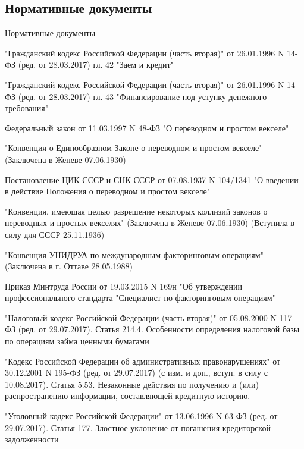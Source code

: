 \documentclass[_Banking_p3.tex]{subfiles}
\begin{document}

\subsection{Нормативные документы}
\begin{frame}[allowframebreaks]{Нормативные документы}
  \begin{thebibliography}{10}
  
  \beamertemplatearticlebibitems
"Гражданский кодекс Российской Федерации (часть вторая)" от 26.01.1996 N 14-ФЗ (ред. от 28.03.2017) гл. 42 "Заем и кредит"

"Гражданский кодекс Российской Федерации (часть вторая)" от 26.01.1996 N 14-ФЗ (ред. от 28.03.2017) гл. 43 "Финансирование под уступку денежного требования"

Федеральный закон от 11.03.1997 N 48-ФЗ "О переводном и простом векселе"

\pagebreak

"Конвенция о Единообразном Законе о переводном и простом векселе" (Заключена в Женеве 07.06.1930)

Постановление ЦИК СССР и СНК СССР от 07.08.1937 N 104/1341 "О введении в действие Положения о переводном и простом векселе"

\pagebreak
"Конвенция, имеющая целью разрешение некоторых коллизий законов о переводных и простых векселях" (Заключена в Женеве 07.06.1930) (Вступила в силу для СССР 25.11.1936)

\pagebreak

"Конвенция УНИДРУА по международным факторинговым операциям" (Заключена в г. Оттаве 28.05.1988)
  
  Приказ Минтруда России от 19.03.2015 N 169н "Об утверждении профессионального стандарта "Специалист по факторинговым операциям" 
  
"Налоговый кодекс Российской Федерации (часть вторая)" от 05.08.2000 N 117-ФЗ (ред. от 29.07.2017). Статья 214.4. Особенности определения налоговой базы по операциям займа ценными бумагами

\pagebreak

"Кодекс Российской Федерации об административных правонарушениях" от 30.12.2001 N 195-ФЗ (ред. от 29.07.2017) (с изм. и доп., вступ. в силу с 10.08.2017). Статья 5.53. Незаконные действия по получению и (или) распространению информации, составляющей кредитную историю.

\pagebreak
"Уголовный кодекс Российской Федерации" от 13.06.1996 N 63-ФЗ (ред. от 29.07.2017). Статья 177. Злостное уклонение от погашения кредиторской задолженности


  \end{thebibliography}
\end{frame}
\end{document}
